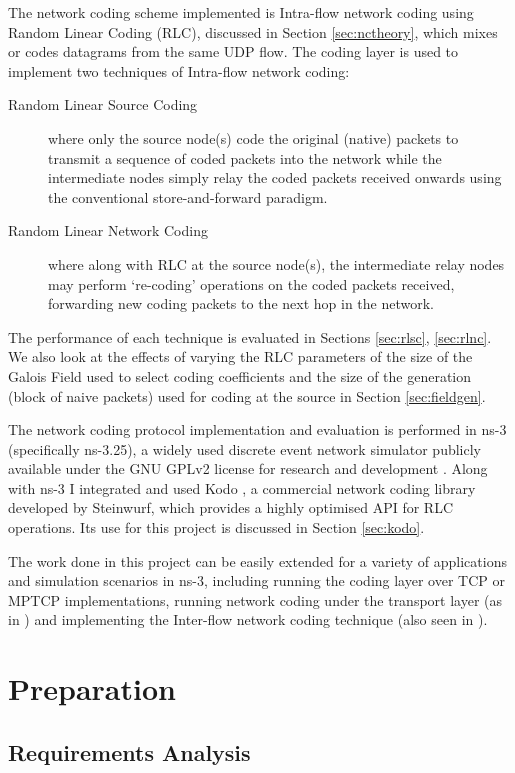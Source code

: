 \documentclass[12pt,a4paper,twoside,openright]{report}
\begin{document}
The network coding scheme implemented is Intra-flow network coding using Random Linear Coding (RLC), discussed in Section \ref{sec:nctheory}, which mixes or codes datagrams from the same UDP flow. The coding layer is used to implement two techniques of Intra-flow network coding:
\begin{description}
 	\item[Random Linear Source Coding] where only the source node(s) code the original (native) packets to transmit a sequence of coded packets into the network while the intermediate nodes simply relay the coded packets received onwards using the conventional store-and-forward paradigm.
 	\item[Random Linear Network Coding] where along with RLC at the source node(s), the intermediate relay nodes may perform `re-coding' operations on the coded packets received, forwarding new coding packets to the next hop in the network.
 \end{description}
 The performance of each technique is evaluated in Sections \ref{sec:rlsc}, \ref{sec:rlnc}. We also look at the effects of varying the RLC parameters of the size of the Galois Field used to select coding coefficients and the size of the generation (block of naive packets) used for coding at the source in Section \ref{sec:fieldgen}.

 The network coding protocol implementation and evaluation is performed in ns-3 (specifically ns-3.25), a widely used discrete event network simulator publicly available under the GNU GPLv2 license for research and development \cite{ns3}. Along with ns-3 I integrated and used Kodo \cite{kodo}, a commercial network coding library developed by Steinwurf, which provides a highly optimised API for RLC operations. Its use for this project is discussed in Section \ref{sec:kodo}.

 The work done in this project can be easily extended for a variety of applications and simulation scenarios in ns-3, including running the coding layer over TCP or MPTCP implementations, running network coding under the transport layer (as in \cite{gomez}) and implementing the Inter-flow network coding technique (also seen in \cite{gomez}).


\chapter{Preparation} \label{ch:prep}

\section{Requirements Analysis} \label{sec:start}
\end{document}
